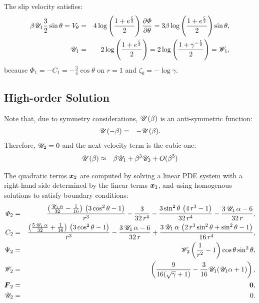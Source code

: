 The slip velocity satisfies:
\begin{eqnarray}
\beta \mathscr{U}_1 \frac{3}{2} \sin\theta =
V_\theta &=& 4 \log \left(\frac{1 + e ^ \frac{\zeta}{2}}{2}\right) \frac{\partial \varPhi}{\partial \theta} 
=
 3 \beta \log \left(\frac{1 + e ^ \frac{\zeta}{2}}{2}\right) \sin\theta, \\
\mathscr{U}_1 &=& 2 \log \left(\frac{1 + e ^ \frac{\zeta}{2}}{2}\right) 
       =  2 \log \left(\frac{1 + \gamma ^ {-\frac{1}{2}}}{2}\right) = \mathscr{W}_1,
\end{eqnarray}
because $\varPhi_1 = -C_1 = -\frac{3}{4} \cos\theta$ on $r=1$
and $\zeta_0 = -\log\gamma$.

\subsection{High-order Solution}
Note that, due to symmetry considerations, $\mathscr{U}(\beta)$ is an anti-symmetric function:
\begin{eqnarray}
\mathscr{U}(-\beta) &=& -\mathscr{U}(\beta).
\end{eqnarray}
Therefore, $\mathscr{U}_2 = 0$ and the next velocity term is the cubic one:
\begin{eqnarray}
\mathscr{U}(\beta) &\approx& \beta \mathscr{U}_1 + \beta^3 \mathscr{U}_3 + O(\beta^5)
\end{eqnarray}

The quadratic terms $\boldsymbol{x}_2$ are computed by solving a linear PDE system 
with a right-hand side determined by the linear terms $\boldsymbol{x}_1$, and using 
homogenous solutions to satisfy boundary conditions:
\begin{eqnarray}
\varPhi_2 &=& \frac{\left(\frac{\mathscr{U}_1\, \alpha}{32} - \frac{1}{16}\right)\, \left(3\, {\cos^2\theta} - 1\right)}{r^3} - \frac{3}{32\, r^4} - \frac{3\, {\sin^2\theta}\, \left(4\, r^3 - 1\right)}{32\, r^4} - \frac{3\, \mathscr{U}_1\, \alpha - 6}{32\, r},
\\
C_2 &=& \frac{\left(\frac{5\, \mathscr{U}_1\, \alpha}{32} + \frac{1}{16}\right)\, \left(3\, {\cos^2\theta} - 1\right)}{r^3} - \frac{3\, \mathscr{U}_1\, \alpha - 6}{32\, r} + \frac{3\, \mathscr{U}_1\, \alpha\, \left(2\, r^3\, {\sin^2\theta} + {\sin^2\theta} - 1\right)}{16\, r^4},
\\
\Psi_2 &=& \mathscr{W}_2
 \left(\frac{1}{r^2} - 1\right) \cos\theta \sin^2\theta,  \\
\mathscr{W}_2 &=& \left(\frac{9}{16(\sqrt{\gamma}+1)} - \frac{3}{16} \mathscr{U}_1 (\mathscr{U}_1 \alpha + 1)\right),\\
\boldsymbol{F}_2 &=& \boldsymbol{0}, \\ \mathscr{U}_2 &=& 0.
\end{eqnarray}


